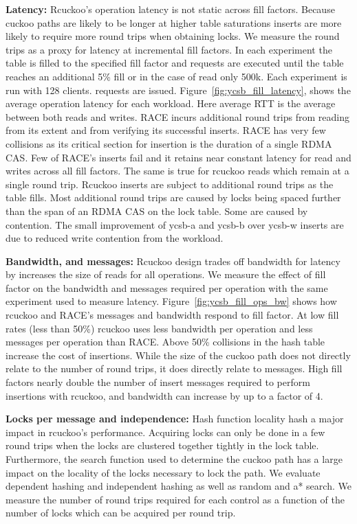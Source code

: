 \textbf{Latency:} Rcuckoo's operation latency is not static
across fill factors. Because cuckoo paths are likely to be
longer at higher table saturations inserts are more likely
to require more round trips when obtaining locks. We measure
the round trips as a proxy for latency at incremental fill
factors. In each experiment the table is filled to the
specified fill factor and requests are executed until the
table reaches an additional 5\% fill or in the case of read
only 500k. Each experiment is run with 128 clients.
requests are issued. 
Figure~\ref{fig:ycsb_fill_latency}, shows the average
operation latency for each workload. Here average RTT is the
average between both reads and writes. RACE incurs
additional round trips from reading from its extent and
from verifying its successful inserts. RACE has very few
collisions as its critical section for insertion is the
duration of a single RDMA CAS. Few of RACE's inserts fail
and it retains near constant latency for read and writes
across all fill factors. The same is true for rcuckoo reads
which remain at a single round trip. Rcuckoo inserts are
subject to additional round trips as the table fills.  Most
additional round trips are caused by locks being spaced
further than the span of an RDMA CAS on the lock table. Some
are caused by contention. The small improvement of ycsb-a
and ycsb-b over ycsb-w inserts are due to reduced write
contention from the workload.

\textbf{Bandwidth, and messages:} Rcuckoo design trades off
bandwidth for latency by increases the size of reads for all
operations. We measure the effect of fill factor on the
bandwidth and messages required per operation with the same
experiment used to measure latency.
Figure~\ref{fig:ycsb_fill_ops_bw} shows how rcuckoo and
RACE's messages and bandwidth respond to fill factor. At low
fill rates (less than 50\%) rcuckoo uses less bandwidth per
operation and less messages per operation than RACE. Above
50\% collisions in the hash table increase the cost of
insertions. While the size of the cuckoo path does not
directly relate to the number of round trips, it does
directly relate to messages. High fill factors nearly double
the number of insert messages required to perform insertions
with rcuckoo, and bandwidth can increase by up to a factor of
4. 

\textbf{Locks per message and independence:} Hash function
locality hash a major impact in rcuckoo's performance.
Acquiring locks can only be done in a few round trips when
the locks are clustered together tightly in the lock table.
Furthermore, the search function used to determine the
cuckoo path has a large impact on the locality of the locks
necessary to lock the path. We evaluate dependent hashing
and independent hashing as well as random and a* search. We
measure the number of round trips required for each control
as a function of the number of locks which can be acquired
per round trip.

